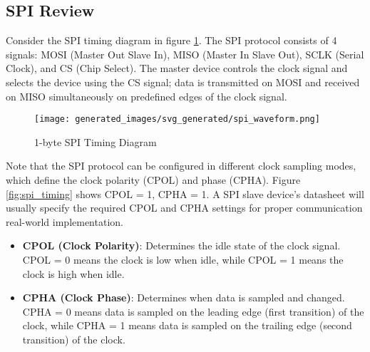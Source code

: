 \documentclass[main.tex]{subfiles}
\begin{document}


\subsection{SPI Review}
Consider the SPI timing diagram in figure \ref{fig:spi_timing_2}. The SPI protocol consists of 4 signals: MOSI (Master Out Slave In), MISO (Master In Slave Out), SCLK (Serial Clock), and CS (Chip Select). The master device controls the clock signal and selects the device using the CS signal; data is transmitted on MOSI and received on MISO simultaneously on predefined edges of the clock signal.

\begin{figure}[H]
    \centering
    \texttt{[image: generated\_images/svg\_generated/spi\_waveform.png]}
    \caption{1-byte SPI Timing Diagram}
    \label{fig:spi_timing_2}
\end{figure}

\noindent Note that the SPI protocol can be configured in different clock sampling modes, which define the clock polarity (CPOL) and phase (CPHA). Figure \ref{fig:spi_timing} shows CPOL = 1, CPHA = 1. A SPI slave device's datasheet will usually specify the required CPOL and CPHA settings for proper communication real-world implementation.
\begin {itemize}
    \item \textbf{CPOL (Clock Polarity)}: Determines the idle state of the clock signal. CPOL = 0 means the clock is low when idle, while CPOL = 1 means the clock is high when idle.
    \item \textbf{CPHA (Clock Phase)}: Determines when data is sampled and changed. CPHA = 0 means data is sampled on the leading edge (first transition) of the clock, while CPHA = 1 means data is sampled on the trailing edge (second transition) of the clock.
\end{itemize}
\end{document}
